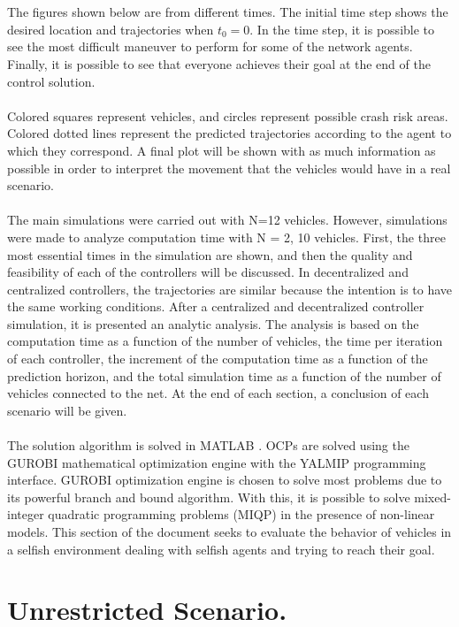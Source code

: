 \\
\\
The figures shown below are from different times. The initial time step shows the desired location and trajectories when $t_0=0$. In the time step, it is possible to see the most difficult maneuver to perform for some of the network agents. Finally, it is possible to see that everyone achieves their goal at the end of the control solution.
\\
\\
Colored squares represent vehicles, and circles represent possible crash risk areas. Colored dotted lines represent the predicted trajectories according to the agent to which they correspond. A final plot will be shown with as much information as possible in order to interpret the movement that the vehicles would have in a real scenario.
\\
\\
The main simulations were carried out with N=12 vehicles. However, simulations were made to analyze computation time with N = {2, 10} vehicles. First, the three most essential times in the simulation are shown, and then the quality and feasibility of each of the controllers will be discussed. In decentralized and centralized controllers, the trajectories are similar because the intention is to have the same working conditions. After a centralized and decentralized controller simulation, it is presented an analytic analysis. The analysis is based on the computation time as a function of the number of vehicles, the time per iteration of each controller, the increment of the computation time as a function of the prediction horizon, and the total simulation time as a function of the number of vehicles connected to the net. At the end of each section, a conclusion of each scenario will be given.
\\
\\
The solution algorithm is solved in MATLAB \cite{Matlab}. OCPs are solved using the GUROBI mathematical optimization engine with the YALMIP programming interface. GUROBI optimization engine is chosen to solve most problems due to its powerful branch and bound algorithm. With this, it is possible to solve mixed-integer quadratic programming problems (MIQP) in the presence of non-linear models. This section of the document seeks to evaluate the behavior of vehicles in a selfish environment dealing with selfish agents and trying to reach their goal. 


\section{Unrestricted Scenario.}

